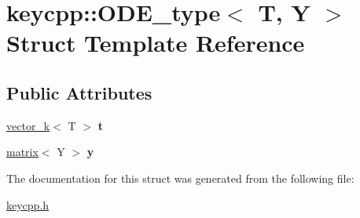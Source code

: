 \hypertarget{structkeycpp_1_1_o_d_e__type}{\section{keycpp\-:\-:O\-D\-E\-\_\-type$<$ T, Y $>$ Struct Template Reference}
\label{structkeycpp_1_1_o_d_e__type}
}
\subsection*{Public Attributes}
\begin{DoxyCompactItemize}
\item 
\hypertarget{structkeycpp_1_1_o_d_e__type_a6681f7b538b38b98836748e70dd388cf}{\hyperlink{classkeycpp_1_1vector__k}{vector\-\_\-k}$<$ T $>$ {\bfseries t}}\label{structkeycpp_1_1_o_d_e__type_a6681f7b538b38b98836748e70dd388cf}

\item 
\hypertarget{structkeycpp_1_1_o_d_e__type_a4b8dba697c9ad61a930b8967f8c54802}{\hyperlink{classkeycpp_1_1matrix}{matrix}$<$ Y $>$ {\bfseries y}}\label{structkeycpp_1_1_o_d_e__type_a4b8dba697c9ad61a930b8967f8c54802}

\end{DoxyCompactItemize}


The documentation for this struct was generated from the following file\-:\begin{DoxyCompactItemize}
\item 
\hyperlink{keycpp_8h}{keycpp.\-h}\end{DoxyCompactItemize}
